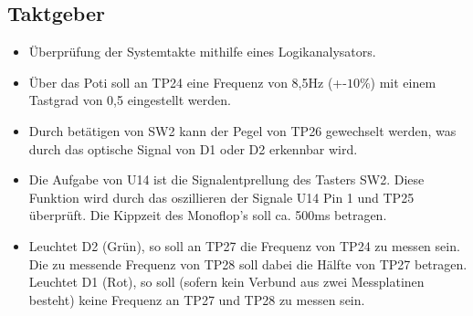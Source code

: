\newpage
\subsection{Taktgeber}


\begin{itemize}
	\item{Überprüfung der Systemtakte mithilfe eines Logikanalysators.}
	
	 \item{Über das Poti soll an TP24 eine Frequenz von 8,5Hz (+-$10\%$) mit einem Tastgrad von 0,5 eingestellt werden.}
	 
	 \item{Durch betätigen von SW2 kann der Pegel von TP26 gewechselt werden, was durch das optische Signal von D1 oder D2 erkennbar wird.}
	 
	 \item{Die Aufgabe von U14 ist die Signalentprellung des Tasters SW2. Diese Funktion wird durch das oszillieren der Signale U14 Pin 1 und TP25 überprüft. Die Kippzeit des Monoflop's soll ca. 500ms betragen.}
	 
	 \item{Leuchtet D2 (Grün), so soll an TP27 die Frequenz von TP24 zu messen sein. Die zu messende Frequenz von TP28 soll dabei die Hälfte von TP27 betragen. Leuchtet D1 (Rot), so soll (sofern kein Verbund aus zwei Messplatinen besteht) keine Frequenz an TP27 und TP28 zu messen sein.}	 
\end{itemize}


